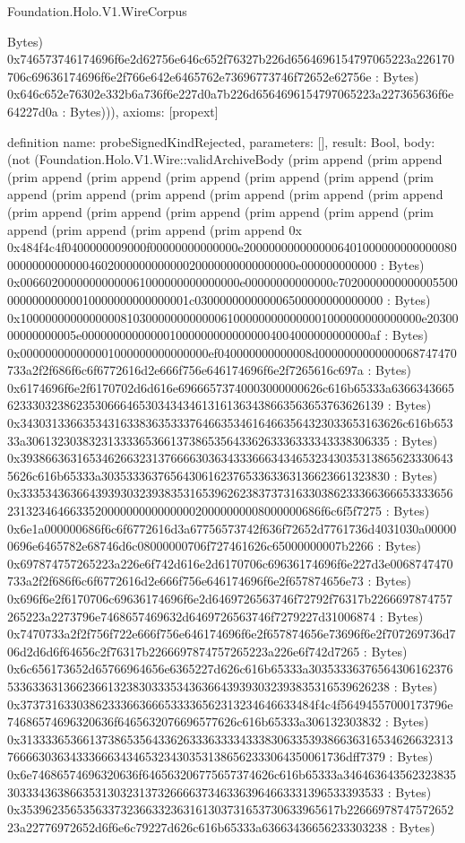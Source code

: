 \begin{lexlean}{Foundation.Holo.V1.WireCorpus}
\begin{semanticmodule}
{Bytes) 0x746573746174696f6e2d62756e646c652f76327b226d6564696154797065223a226170706c69636174696f6e2f766e642e6465762e73696773746f72652e62756e : Bytes) 0x646c652e76302e332b6a736f6e227d0a7b226d6564696154797065223a227365636f6e64227d0a : Bytes))),
  axioms: [propext]
}

definition{
  name: probeSignedKindRejected,
  parameters: [],
  result: Bool,
  body: (not (Foundation.Holo.V1.Wire::validArchiveBody (prim append (prim append (prim append (prim append (prim append (prim append (prim append (prim append (prim append (prim append (prim append (prim append (prim append (prim append (prim append (prim append (prim append (prim append (prim append (prim append (prim append (prim append 0x 0x484f4c4f0400000009000f00000000000000e20000000000000064010000000000000800000000000000460200000000000020000000000000000e000000000000 : Bytes) 0x00660200000000000061000000000000000e00000000000000c702000000000000550000000000000010000000000000001c030000000000006500000000000000 : Bytes) 0x1000000000000000810300000000000061000000000000001000000000000000e2030000000000005e0000000000000010000000000000004004000000000000af : Bytes) 0x000000000000001000000000000000ef040000000000008d0000000000000068747470733a2f2f686f6c6f6772616d2e666f756e646174696f6e2f7265616c697a : Bytes) 0x6174696f6e2f6170702d6d616e69666573740003000000626c616b65333a6366343665623330323862353066646530343434613161363438663563653763626139 : Bytes) 0x3430313366353431633836353337646635346164663564323033653163626c616b65333a3061323038323133336536613738653564336263336333343338306335 : Bytes) 0x3938663631653462663231376666303634333666343465323430353138656233306435626c616b65333a3035333637656430616237653363363136623661323830 : Bytes) 0x33353436366439393032393835316539626238373731633038623336636665333365623132346466335200000000000000020000000008000000686f6c6f5f7275 : Bytes) 0x6e1a000000686f6c6f6772616d3a67756573742f636f72652d7761736d4031030a000000696e6465782e68746d6c08000000706f727461626c65000000007b2266 : Bytes) 0x697874757265223a226e6f742d616e2d6170706c69636174696f6e227d3e0068747470733a2f2f686f6c6f6772616d2e666f756e646174696f6e2f657874656e73 : Bytes) 0x696f6e2f6170706c69636174696f6e2d6469726563746f72792f76317b2266697874757265223a2273796e7468657469632d6469726563746f7279227d31006874 : Bytes) 0x7470733a2f2f756f722e666f756e646174696f6e2f657874656e73696f6e2f707269736d706d2d6d6f64656c2f76317b2266697874757265223a226e6f742d7265 : Bytes) 0x6c656173652d65766964656e6365227d626c616b65333a303533363765643061623765336336313662366132383033353436366439393032393835316539626238 : Bytes) 0x37373163303862333663666533336562313234646633484f4c4f56494557000173796e74686574696320636f6465632076696577626c616b65333a306132303832 : Bytes) 0x313333653661373865356433626333633334333830633539386636316534626632313766663036343336663434653234303531386562333064350061736dff7379 : Bytes) 0x6e74686574696320636f646563206775657374626c616b65333a346463643562323835303334363866353130323137326666373463363964663331396533393533 : Bytes) 0x353962356535633732366332363161303731653730633965617b2266697874757265223a22776972652d6f6e6c79227d626c616b65333a63663436656233303238 : Bytes) }
\end{semanticmodule}
\end{lexlean}
